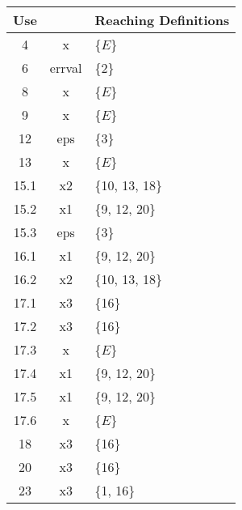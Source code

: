 \documentclass{article}
\newcommand\s[1]{\{#1\}}
\newcommand\varfamily{\ttfamily}  %
\begin{document}
\begin{enumerate}
    \begin{center}
      \begin{tabular}{c>{\varfamily}cl}
        \toprule
        Use
        & \multicolumn{1}{c}{Variable}
        & Reaching Definitions
        \\
        \midrule
        4    & x      & \s{$E$}        \\
        6    & errval & \s{2}          \\
        8    & x      & \s{$E$}        \\
        9    & x      & \s{$E$}        \\
        12   & eps    & \s{3}          \\
        13   & x      & \s{$E$}        \\
        15.1 & x2     & \s{10, 13, 18} \\
        15.2 & x1     & \s{9, 12, 20}  \\
        15.3 & eps    & \s{3}          \\
        16.1 & x1     & \s{9, 12, 20}  \\
        16.2 & x2     & \s{10, 13, 18} \\
        17.1 & x3     & \s{16}         \\
        17.2 & x3     & \s{16}         \\
        17.3 & x      & \s{$E$}        \\
        17.4 & x1     & \s{9, 12, 20}  \\
        17.5 & x1     & \s{9, 12, 20}  \\
        17.6 & x      & \s{$E$}        \\
        18   & x3     & \s{16}         \\
        20   & x3     & \s{16}         \\
        23   & x3     & \s{1, 16}      \\
        \bottomrule
      \end{tabular}
    \end{center}


\end{enumerate}
\end{document}
